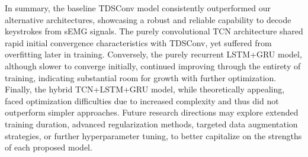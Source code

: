 In summary, the baseline TDSConv model consistently outperformed our alternative architectures, showcasing a robust and reliable capability to decode keystrokes from sEMG signals. The purely convolutional TCN architecture shared rapid initial convergence characteristics with TDSConv, yet suffered from overfitting later in training. Conversely, the purely recurrent LSTM+GRU model, although slower to converge initially, continued improving through the entirety of training, indicating substantial room for growth with further optimization. Finally, the hybrid TCN+LSTM+GRU model, while theoretically appealing, faced optimization difficulties due to increased complexity and thus did not outperform simpler approaches. Future research directions may explore extended training duration, advanced regularization methods, targeted data augmentation strategies, or further hyperparameter tuning, to better capitalize on the strengths of each proposed model.

